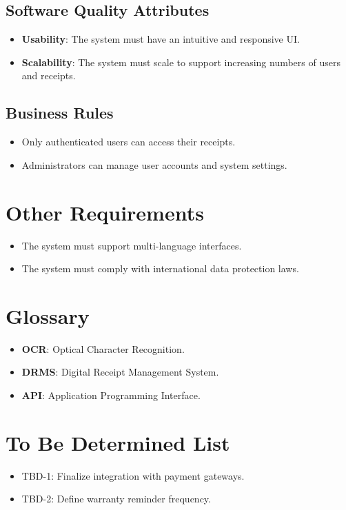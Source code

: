 \documentclass[12pt]{article}
\begin{document}
\subsection{Software Quality Attributes}
\begin{itemize}
    \item \textbf{Usability}: The system must have an intuitive and responsive UI.
    \item \textbf{Scalability}: The system must scale to support increasing numbers of users and receipts.
\end{itemize}

\subsection{Business Rules}
\begin{itemize}
    \item Only authenticated users can access their receipts.
    \item Administrators can manage user accounts and system settings.
\end{itemize}

\section{Other Requirements}
\begin{itemize}
    \item The system must support multi-language interfaces.
    \item The system must comply with international data protection laws.
\end{itemize}

\appendix
\section{Glossary}
\begin{itemize}
    \item \textbf{OCR}: Optical Character Recognition.
    \item \textbf{DRMS}: Digital Receipt Management System.
    \item \textbf{API}: Application Programming Interface.
\end{itemize}

\section{To Be Determined List}
\begin{itemize}
    \item TBD-1: Finalize integration with payment gateways.
    \item TBD-2: Define warranty reminder frequency.
\end{itemize}
\end{document}

